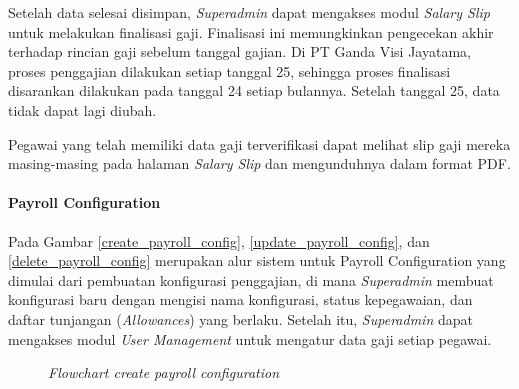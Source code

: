 Setelah data selesai disimpan, \textit{Superadmin} dapat mengakses modul \textit{Salary Slip} untuk melakukan finalisasi gaji. Finalisasi ini memungkinkan pengecekan akhir terhadap rincian gaji sebelum tanggal gajian. Di PT Ganda Visi Jayatama, proses penggajian dilakukan setiap tanggal 25, sehingga proses finalisasi disarankan dilakukan pada tanggal 24 setiap bulannya. Setelah tanggal 25, data tidak dapat lagi diubah.

Pegawai yang telah memiliki data gaji terverifikasi dapat melihat slip gaji mereka masing-masing pada halaman \textit{Salary Slip} dan mengunduhnya dalam format PDF.

\paragraph{Payroll Configuration}

Pada Gambar \ref{create_payroll_config}, \ref{update_payroll_config}, dan \ref{delete_payroll_config} merupakan alur sistem untuk Payroll Configuration yang dimulai dari pembuatan konfigurasi penggajian, di mana \textit{Superadmin} membuat konfigurasi baru dengan mengisi nama konfigurasi, status kepegawaian, dan daftar tunjangan (\textit{Allowances}) yang berlaku. Setelah itu, \textit{Superadmin} dapat mengakses modul \textit{User Management} untuk mengatur data gaji setiap pegawai.
\begin{figure}[H]
    \centering
    \caption{\textit{Flowchart create payroll configuration}}
    \label{fig:create_payroll_config}
\end{figure}

